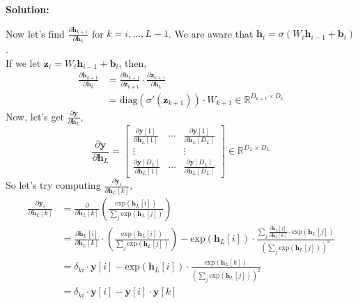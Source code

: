 \documentclass{article}
\newenvironment{solution}
  {\par\noindent\textbf{Solution:}\par}
  {\par}
\begin{document}
\begin{solution}
  Now let's find $\frac{\partial \textbf{h}_{k + 1}}{\partial \textbf{h}_{k}}$ for $k=i,\dots,L-1$. We are aware that $\textbf{h}_i = \sigma \left(W_i\textbf{h}_{i-1} + \textbf{b}_i \right)$. \\ 
  If we let $\textbf{z}_i = W_i\textbf{h}_{i-1} +\textbf{b}_i$, then,
  \[
    \begin{aligned}
      \frac{\partial \textbf{h}_{k+1}}{\partial \textbf{h}_k} &= \frac{\partial \textbf{h}_{k+1}}{\partial \textbf{z}_{k+1}}\cdot \frac{\partial \textbf{z}_{k+1}}{\partial \textbf{h}_k}  \\ 
                                                              &= \text{diag}(\sigma'(\textbf{z}_{k+1})) \cdot W_{k+1} \in \mathbb{R}^{D_{k+1} \times D_k}
    \end{aligned}
  \]
  Now, let's get $\frac{\partial \textbf{y}}{\partial \textbf{h}_L}$,
\[
  \frac{\partial \textbf{y}}{\partial \textbf{h}_L} = \begin{bmatrix}     
    \frac{\partial \textbf{y}[1]}{\partial \textbf{h}_L[1]} & \cdots & \frac{\partial \textbf{y}[1]}{\partial \textbf{h}_L[D_L]} \\ 
    \vdots & & \vdots \\ 
    \frac{\partial \textbf{y}[D_L]}{\partial \textbf{h}_L[1]} & \cdots  & \frac{\partial \textbf{y}[D_L]}{\partial \textbf{h}_L[D_L]} 

  \end{bmatrix} \in \mathbb{R}^{D_L \times D_L}
\]
So let's try computing $\frac{\partial \textbf{y}_i}{\partial \textbf{h}_L[k]}$,
\[
  \begin{aligned}
    \frac{\partial \textbf{y}_i}{\partial \textbf{h}_L[k]} &= \frac{\partial}{\partial \textbf{h}_L[k]} \left( \frac{\text{exp}(\textbf{h}_L[i])}{\sum_j \text{exp}(\textbf{h}_L[j])} \right) \\ 
                                                           &= \frac{\partial \textbf{h}_L[i]}{\partial \textbf{h}_L[k]} \cdot \left( \frac{\text{exp}(\textbf{h}_L[i])}{\sum_j \text{exp}(\textbf{h}_L[j])} \right) - \text{exp}(\textbf{h}_L[i])\cdot \frac{\sum_j \frac{\partial \textbf{h}_L[j]}{\partial \textbf{h}_L[k]}\cdot \text{exp}(\textbf{h}_L[j])}{\left( \sum_j \text{exp}(\textbf{h}_L[j]) \right)^2} \\ 
                                                           &= \delta_{ki} \cdot \textbf{y}[i] - \text{exp}(\textbf{h}_L[i]) \cdot \frac{\text{exp}(\textbf{h}_L[k])}{\left( \sum_j \text{exp}(\textbf{h}_L[j]) \right)^2} \\ 
                                                           &= \delta_{ki} \cdot \textbf{y}[i] - \textbf{y}[i] \cdot \textbf{y}[k]
  \end{aligned}
\]


\end{solution}
\end{document}

